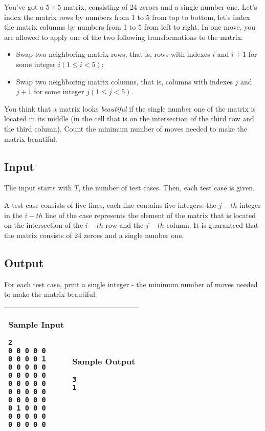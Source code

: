 You've got a $5 \times 5$ matrix, consisting of 24 zeroes and a single number one.
Let's index the matrix rows by numbers from 1 to 5 from top to bottom, let's
index the matrix columns by numbers from 1 to 5 from left to right. In one move,
you are allowed to apply one of the two following transformations to the
matrix:

\begin{itemize}
    \item Swap two neighboring matrix rows, that is, rows with indexes $i$ and
    $i+1$ for some integer $i $$(1 \leq i < 5)$;
    \item Swap two neighboring matrix columns, that is, columns with indexes $j$
    and $j+1$ for some integer $j $$(1 \leq j < 5)$.
\end{itemize}

You think that a matrix looks \textit{beautiful} if the single number one of the matrix
is located in its middle (in the cell that is on the intersection of the third
row and the third column). Count the minimum number of moves needed to
make the matrix beautiful.

\subsection*{Input}

The input starts with $T$, the number of test cases. Then, each test case is
given.

A test case consists of five lines, each line contains five integers: the $j-th$
integer in the $i-th$ line of the case represents the element of the matrix that
is located on the intersection of the $i-th$ row and the $j-th$ column. It is
guaranteed that the matrix consists of 24 zeroes and a single number one.

\subsection*{Output}

For each test case, print a single integer - the minimum number of moves needed to make the matrix
beautiful.

\begin{table}[!h]
\centering
\begin{tabular}{|l|l|}
\hline
\begin{minipage}[t]{3in}
\textbf{Sample Input}
\begin{verbatim}
2
0 0 0 0 0
0 0 0 0 1
0 0 0 0 0
0 0 0 0 0
0 0 0 0 0
0 0 0 0 0
0 0 0 0 0
0 1 0 0 0
0 0 0 0 0
0 0 0 0 0
\end{verbatim}
\vspace{1mm}
\end{minipage}
&

\begin{minipage}[t]{3in}
\textbf{Sample Output}
\begin{verbatim}
3
1
\end{verbatim}
\vspace{1mm}
\end{minipage} \\
\hline
\end{tabular}
\end{table}

\newpage
